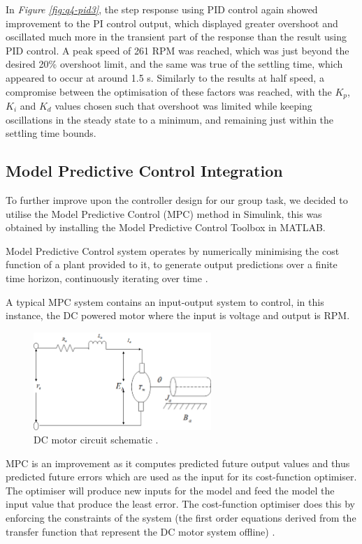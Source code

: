 \documentclass[11pt, onecolumn]{article}
\begin{document}
\par In \textit{Figure \ref{fig:q4-pid3}}, the step response using PID control again showed improvement to the PI control output, which displayed greater overshoot and oscillated much more in the transient part of the response than the result using PID control. A peak speed of 261 RPM was reached, which was just beyond the desired 20\% overshoot limit, and the same was true of the settling time, which appeared to occur at around 1.5 s. Similarly to the results at half speed, a compromise between the optimisation of these factors was reached, with the $K_p$, $K_i$ and $K_d$ values chosen such that overshoot was limited while keeping oscillations in the steady state to a minimum, and remaining just within the settling time bounds.
\subsection*{Model Predictive Control Integration}
\par To further improve upon the controller design for our group task, we decided to utilise the Model Predictive Control (MPC) method in Simulink, this was obtained by installing the Model Predictive Control Toolbox in MATLAB.
\par Model Predictive Control system operates by numerically minimising the cost function of a plant provided to it, to generate output predictions over a finite time horizon, continuously iterating over time \cite{Nikolaou2001}.
\par A typical MPC system contains an input-output system to control, in this instance, the DC powered motor where the input is voltage and output is RPM.
\begin{figure}[h!]
    \centering
    \includegraphics[width=0.6\textwidth]{q4-schematic.png}
    \caption{DC motor circuit schematic \cite{article}.}
    \label{fig:q4-schematic}
\end{figure}
\par MPC is an improvement as it computes predicted future output values and thus predicted future errors which are used as the input for its cost-function optimiser. The optimiser will produce new inputs for the model and feed the model the input value that produce the least error. The cost-function optimiser does this by enforcing the constraints of the system (the first order equations derived from the transfer function that represent the DC motor system offline) \cite{libretexts123MIMO}.
\end{document}
